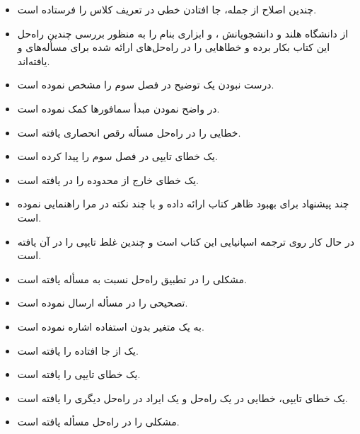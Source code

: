 \documentclass{book}
\begin{document}
\begin{itemize}
\item {}
    چندین اصلاح از جمله، جا افتادن خطی در تعریف کلاس  را فرستاده است. 

\item {}
    از دانشگاه  هلند و دانشجویانش 
    ،  و 
    ابزاری بنام  را به منظور بررسی چندین راه‌حل این کتاب بکار برده و خطاهایی را در راه‌حل‌های ارائه شده برای 
    مسأله‌های  و   یافته‌اند. 
    
\item {}
    درست نبودن یک توضیح در فصل سوم را مشخص نموده است. 


\item  {} 
    در واضح نمودن مبدأ سمافورها کمک نموده است. 

\item {} 
    خطایی را در راه‌حل مسأله رقص انحصاری یافته است. 

\item {} یک خطای تایپی در فصل سوم را پیدا کرده است. 

\item {} 
    یک خطای خارج از محدوده را در  یافته است. 

\item {}
    چند پیشنهاد برای بهبود ظاهر کتاب ارائه داده و با چند نکته در \lr{\LaTeX} مرا راهنمایی نموده است. 
    
\item   {} 
    در حال کار روی ترجمه اسپانیایی این کتاب است و چندین غلط تایپی را در آن یافته است. 

\item {} 
    مشکلی را در تطبیق راه‌حل  نسبت به مسأله  یافته است. 

\item {}
    تصحیحی را در مسأله   ارسال نموده است. 
    
\item {}
    به یک متغیر بدون استفاده اشاره نموده است. 

\item {}
    یک  از جا افتاده را یافته است. 

\item {} یک خطای تایپی را یافته است. 

\item {}    یک خطای تایپی، خطایی در یک راه‌حل و یک ایراد در راه‌حل دیگری را یافته است. 

\item {} 
    مشکلی را در راه‌حل مسأله   یافته است. 

\end{itemize}
\end{document}
